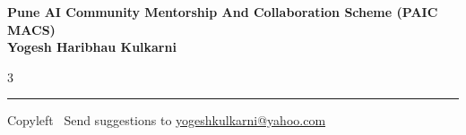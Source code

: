 \documentclass[8pt,landscape]{article}
\begin{document}
\footnotesize


\begin{center}
\Large{\textbf{Pune AI Community Mentorship And Collaboration Scheme (PAIC MACS)\\ Yogesh Haribhau Kulkarni}}
\end{center}

\begin{multicols}{3}

\end{multicols}

\rule{\linewidth}{0.25pt}
\scriptsize
Copyleft \textcopyleft\  Send suggestions to
\href{http://www.yogeshkulkarni.com}{yogeshkulkarni@yahoo.com}
\end{document}
